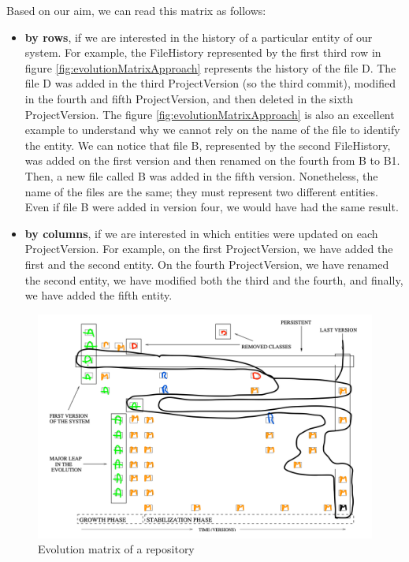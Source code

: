 Based on our aim, we can read this matrix as follows:
 \begin{itemize}
     \item \textbf{by rows}, if we are interested in the history of a particular entity of our system. 
     For example, the FileHistory represented by the first third row in figure \ref{fig:evolutionMatrixApproach} represents the history of the file D. 
     The file D was added in the third ProjectVersion (so the third commit), modified in the fourth and fifth ProjectVersion, and then deleted in the sixth ProjectVersion.
     The figure \ref{fig:evolutionMatrixApproach} is also an excellent example to understand why we cannot rely on the name of the file to identify the entity. 
     We can notice that file B, represented by the second FileHistory, was added on the first version and then renamed on the fourth from B to B1. 
     Then, a new file called B was added in the fifth version. Nonetheless, the name of the files are the same; they must represent two different entities. 
     Even if file B were added in version four, we would have had the same result. 
     \item \textbf{by columns}, if we are interested in which entities were updated on each ProjectVersion. 
    For example, on the first ProjectVersion, we have added the first and the second entity. 
    On the fourth ProjectVersion, we have renamed the second entity, we have modified both the third and the fourth, and finally, we have added the fifth entity.
 \end{itemize}

\begin{figure}
    \center
    \includegraphics[width=\textwidth]{ApproachMatrix2.png}
    \caption{Evolution matrix of a repository}
    \label{fig:evolutionMatrixApproach2}
\end{figure}

